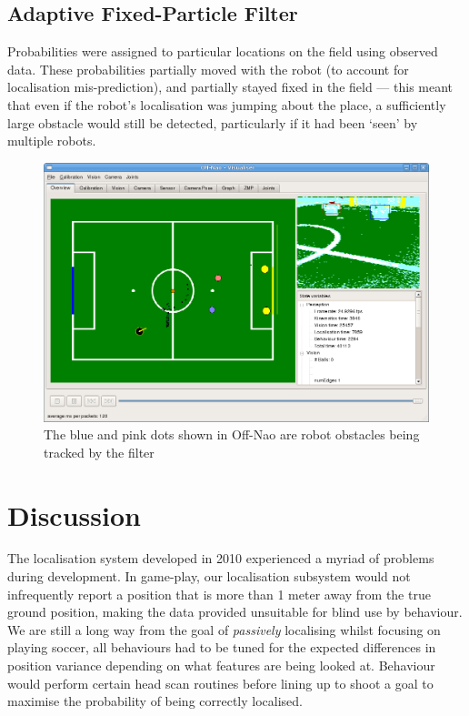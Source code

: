\documentclass[pdftex,11pt,a4paper]{report}
\begin{document}
\subsection{Adaptive Fixed-Particle Filter}

Probabilities were assigned to particular locations on the field using observed data. These probabilities partially moved with the robot (to account for localisation mis-prediction), and partially stayed fixed in the field --- this meant that even if the robot's localisation was jumping about the place, a sufficiently large obstacle would still be detected, particularly if it had been `seen' by multiple robots.

\begin{figure} [ht]
\centering
\includegraphics[width=1.0\textwidth]{figures/obstacleFilter}
\caption{The blue and pink dots shown in Off-Nao are robot obstacles being tracked by the filter} \label{fig-obstacles}
\end{figure}

\section{Discussion}

The localisation system developed in 2010 experienced a myriad of problems during development. In game-play, our localisation subsystem would not infrequently report a position that is more than 1 meter away from the true ground position, making the data provided unsuitable for blind use by behaviour. We are still a long way from the goal of \emph{passively} localising whilst focusing on playing soccer, all behaviours had to be tuned for the expected differences in position variance depending on what features are being looked at. Behaviour would perform certain head scan routines before lining up to shoot a goal to maximise the probability of being correctly localised.
\end{document}
